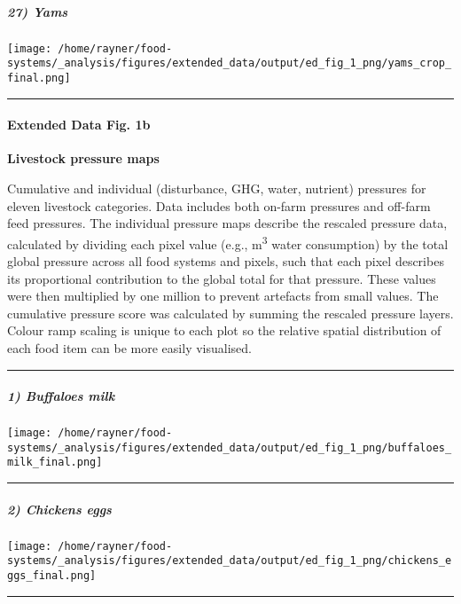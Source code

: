\documentclass[
]{article}
\begin{document}
\hypertarget{yams}{%
\subparagraph{27) Yams}\label{yams}}

\texttt{[image: /home/rayner/food-systems/\_analysis/figures/extended\_data/output/ed\_fig\_1\_png/yams\_crop\_final.png]}

\begin{center}\rule{0.5\linewidth}{0.5pt}\end{center}

\hypertarget{extended-data-fig.-1b}{%
\paragraph{Extended Data Fig. 1b}\label{extended-data-fig.-1b}}

\textbf{Livestock pressure maps}

Cumulative and individual (disturbance, GHG, water, nutrient) pressures
for eleven livestock categories. Data includes both on-farm pressures
and off-farm feed pressures. The individual pressure maps describe the
rescaled pressure data, calculated by dividing each pixel value (e.g.,
m\textsuperscript{3} water consumption) by the total global pressure
across all food systems and pixels, such that each pixel describes its
proportional contribution to the global total for that pressure. These
values were then multiplied by one million to prevent artefacts from
small values. The cumulative pressure score was calculated by summing
the rescaled pressure layers. Colour ramp scaling is unique to each plot
so the relative spatial distribution of each food item can be more
easily visualised.

\begin{center}\rule{0.5\linewidth}{0.5pt}\end{center}

\hypertarget{buffaloes-milk}{%
\subparagraph{1) Buffaloes milk}\label{buffaloes-milk}}

\texttt{[image: /home/rayner/food-systems/\_analysis/figures/extended\_data/output/ed\_fig\_1\_png/buffaloes\_milk\_final.png]}

\begin{center}\rule{0.5\linewidth}{0.5pt}\end{center}

\hypertarget{chickens-eggs}{%
\subparagraph{2) Chickens eggs}\label{chickens-eggs}}

\texttt{[image: /home/rayner/food-systems/\_analysis/figures/extended\_data/output/ed\_fig\_1\_png/chickens\_eggs\_final.png]}

\begin{center}\rule{0.5\linewidth}{0.5pt}\end{center}
\end{document}
